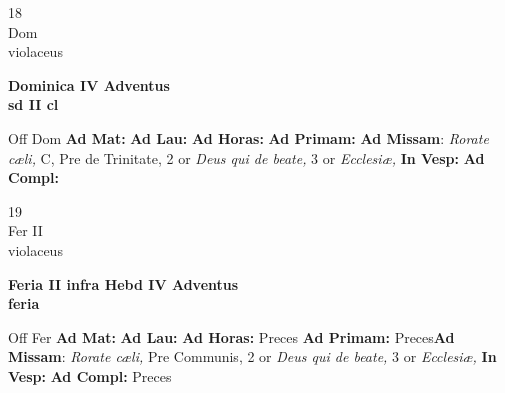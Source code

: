 \documentclass[10pt, openany]{book}
\begin{document}
        \begin{center}
            \begin{minipage}{3.5in}
                \vspace{2em}
                \begin{minipage}{0.5in}
                    {\Huge 18} \\
                    {\normalsize Dom} \\
                    {\normalsize violaceus}
                \end{minipage}
                \begin{minipage}{3.0in}
                    \textbf{ \large Dominica IV Adventus \\
                    \textnormal{\normalsize sd II cl}} \\ 
                \end{minipage}
                \begin{justify}Off Dom
                    \textbf{Ad Mat: }
                    \textbf{Ad Lau: }
                    \textbf{Ad Horas: }
                    \textbf{Ad Primam: }\textbf{Ad Missam}: \textit{Rorate cæli,} C, Pre de Trinitate, 2 or \textit{Deus qui de beate,} 3 or \textit{Ecclesiæ,}  
                    \textbf{In Vesp: }
                    \textbf{Ad Compl: }
                \end{justify}
            \end{minipage}
        \end{center}
    
        \begin{center}
            \begin{minipage}{3.5in}
                \vspace{2em}
                \begin{minipage}{0.5in}
                    {\Huge 19} \\
                    {\normalsize Fer II} \\
                    {\normalsize violaceus}
                \end{minipage}
                \begin{minipage}{3.0in}
                    \textbf{ \large Feria II infra Hebd IV Adventus \\
                    \textnormal{\normalsize feria}} \\ 
                \end{minipage}
                \begin{justify}Off Fer
                    \textbf{Ad Mat: }
                    \textbf{Ad Lau: }
                    \textbf{Ad Horas: }Preces
                    \textbf{Ad Primam: }Preces\textbf{Ad Missam}: \textit{Rorate cæli,} Pre Communis, 2 or \textit{Deus qui de beate,} 3 or \textit{Ecclesiæ,}  
                    \textbf{In Vesp: }
                    \textbf{Ad Compl: }Preces
                \end{justify}
            \end{minipage}
        \end{center}
    
\end{document}
